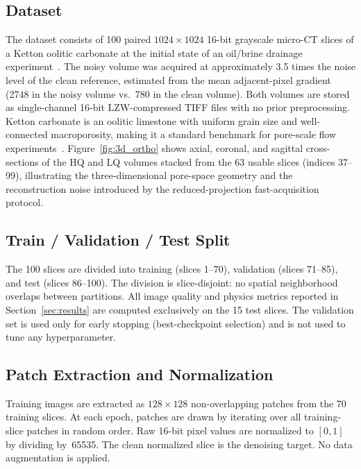 \documentclass[review,12pt]{elsarticle}
\begin{document}
\subsection{Dataset}
\label{sec:methods:dataset}

The dataset consists of 100 paired $1024 \times 1024$ 16-bit grayscale
micro-CT slices of a Ketton oolitic carbonate at the initial state of
an oil/brine drainage experiment~\cite{Ma2026zenodo}.  The noisy volume was acquired at
approximately 3.5 times the noise level of the clean reference,
estimated from the mean adjacent-pixel gradient (2748 in the noisy
volume vs.\ 780 in the clean volume).  Both volumes are stored as
single-channel 16-bit LZW-compressed TIFF files with no prior
preprocessing.  Ketton carbonate is an oolitic limestone with uniform
grain size and well-connected macroporosity, making it a standard
benchmark for pore-scale flow experiments~\cite{Berg2013,Andrew2014}.
Figure~\ref{fig:3d_ortho} shows axial, coronal, and sagittal
cross-sections of the HQ and LQ volumes stacked from the 63 usable
slices (indices 37--99), illustrating the three-dimensional pore-space
geometry and the reconstruction noise introduced by the reduced-projection
fast-acquisition protocol.

\subsection{Train / Validation / Test Split}
\label{sec:methods:split}

The 100 slices are divided into training (slices 1--70), validation
(slices 71--85), and test (slices 86--100).  The division is
slice-disjoint: no spatial neighborhood overlaps between partitions.
All image quality and physics metrics reported in
Section~\ref{sec:results} are computed exclusively on the 15 test
slices.  The validation set is used only for early stopping
(best-checkpoint selection) and is not used to tune any hyperparameter.

\subsection{Patch Extraction and Normalization}
\label{sec:methods:patches}

Training images are extracted as $128 \times 128$ non-overlapping
patches from the 70 training slices.  At each epoch, patches are drawn
by iterating over all training-slice patches in random order.  Raw
16-bit pixel values are normalized to $[0, 1]$ by dividing by~65535.
The clean normalized slice is the denoising target.  No data
augmentation is applied.
\end{document}
